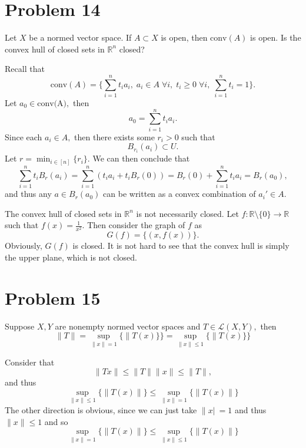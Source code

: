 \documentclass[11pt]{article}
\newcommand{\bbR}{\mathbb{R}}
\begin{document}
\section*{Problem 14}
\begin{problem}
    Let $X$ be a normed vector space. If $A\subset X$ is open, then $\text{conv}(A)$ is open. Is the convex hull of closed sets in $\bbR^n$ closed?
\end{problem}
\begin{solution}
    Recall that 
    \[\text{conv}(A) = \{\sum_{i=1}^nt_i a_i, \; a_i \in A \;\forall i, \; t_i \geq 0\; \forall i, \;\sum_{i=1}^n t_i = 1\}.\]  Let $a_0 \in \text{conv(A)},$ then 
    \[a_0 = \sum_{i=1}^nt_i a_i.\] Since each $a_i \in A,$ then there exists some $r_i>0$ such that 
    \[B_{r_i}(a_i)\subset U.\] Let $r = \min_{i\in [n]} \{r_i\}.$ We can then conclude that
    \[\sum_{i=1}^n t_iB_{r}(a_i) = \sum_{i=1}^n(t_ia_i + t_i B_r(0)) = B_r(0) + \sum_{i=1}^nt_ia_i = B_r(a_0),\] and thus any $a\in B_r(a_0)$ can be written as a convex combination of $a_i'\in A.$

    The convex hull of closed sets in $\bbR^n$ is not necessarily closed. Let $f: \bbR\setminus\{0\} \to \bbR$ such that $f(x) = \frac{1}{x^2}.$ Then consider the graph of $f$ as
    \[G(f) = \{(x, f(x))\}.\] Obviously, $G(f)$ is closed. It is not hard to see that the convex hull is simply the upper plane, which is not closed. 
\end{solution}

\newpage
\section*{Problem 15}
\begin{problem}
    Suppose $X,Y$ are nonempty normed vector spaces and $T\in \mathcal{L}(X, Y),$
    then 
    \[\|T\| = \sup_{\|x\| = 1}\{\|T(x)\}\} = \sup_{\|x\| \leq 1}\{\|T(x)\}\}\]
\end{problem}
\begin{solution}
    Consider that \[\|Tx\| \leq \|T\|\|x\| \leq \|T\|,\] and thus \[\sup_{\|x\| \leq 1}\{\|T(x)\|\} \leq \sup_{\|x\| = 1}\{\|T(x)\|\}\]
    The other direction is obvious, since we can just take $\|x|\ = 1$ and thus $\|x\| \leq 1$ and so
    \[\sup_{\|x\| = 1}\{\|T(x)\|\} \leq \sup_{\|x\| \leq 1}\{\|T(x)\|\}\]
\end{solution}
\newpage
\end{document}
